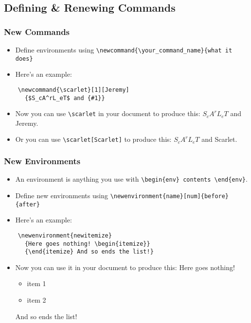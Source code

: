 \documentclass{beamer}
\begin{document}
\subsection{Defining \& Renewing Commands}
\begin{frame}[fragile]
  \frametitle{New Commands}
  \begin{itemize}
    \item Define environments using \verb.\newcommand{\your_command_name}{what it does}.
    \item Here's an example:
  \end{itemize}
  \begin{verbatim}
    \newcommand{\scarlet}[1][Jeremy]
      {$S_cA^rL_eT$ and {#1}}
  \end{verbatim}
  \newcommand{\scarlet}[1][Jeremy]{$S_cA^rL_eT$ and {#1}}
  \begin{itemize}
    \item Now you can use \verb.\scarlet. in your document to produce this: \scarlet.
    \item Or you can use \verb.\scarlet[Scarlet]. to produce this: \scarlet[Scarlet].
  \end{itemize}
\end{frame}
\begin{frame}[fragile]
  \frametitle{New Environments}
  \begin{itemize}
    \item An environment is anything you use with \verb.\begin{env} contents \end{env}..
    \item Define new environments using \verb.\newenvironment{name}[num]{before}{after}.
    \item Here's an example:
  \end{itemize}
  \begin{verbatim}
    \newenvironment{newitemize}
      {Here goes nothing! \begin{itemize}}
      {\end{itemize} And so ends the list!}
  \end{verbatim}
  \newenvironment{newitemize}
    {Here goes nothing! \begin{itemize}}
    {\end{itemize} And so ends the list!}
  \begin{itemize}
    \item Now you can use it in your document to produce this:
      \begin{newitemize}
        \item item 1
        \item item 2
      \end{newitemize}
  \end{itemize}

\end{frame}
\end{document}
